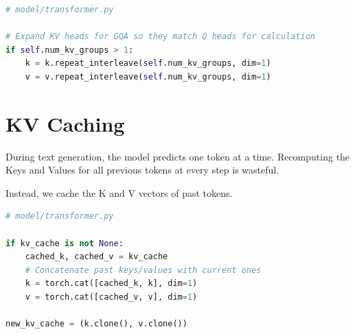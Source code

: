 \begin{lstlisting}[language=Python, caption=GQA Implementation]
# model/transformer.py

# Expand KV heads for GQA so they match Q heads for calculation
if self.num_kv_groups > 1:
    k = k.repeat_interleave(self.num_kv_groups, dim=1)
    v = v.repeat_interleave(self.num_kv_groups, dim=1)
\end{lstlisting}

\section{KV Caching}
During text generation, the model predicts one token at a time. Recomputing the Keys and Values for all previous tokens at every step is wasteful.

Instead, we cache the K and V vectors of past tokens.

\begin{lstlisting}[language=Python, caption=KV Caching Logic]
# model/transformer.py

if kv_cache is not None:
    cached_k, cached_v = kv_cache
    # Concatenate past keys/values with current ones
    k = torch.cat([cached_k, k], dim=1)
    v = torch.cat([cached_v, v], dim=1)
    
new_kv_cache = (k.clone(), v.clone())
\end{lstlisting}
